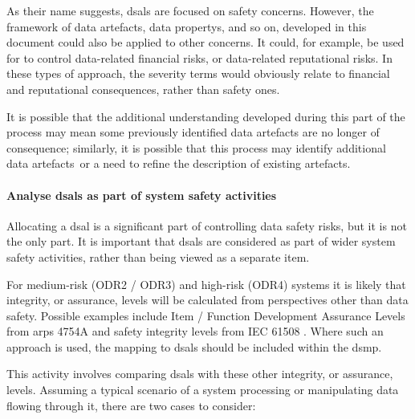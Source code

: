 As their name suggests, \glspl{dsal} are focused on safety concerns. However, the framework of \glspl{data artefact}, \glspl{data property}, and so on, developed in this document could also be applied to other concerns. It could, for example, be used for to control data-related financial risks, or data-related reputational risks. In these types of approach, the severity terms would obviously relate to financial and reputational consequences, rather than safety ones.

It is possible that the additional understanding developed during this part of the process may mean some previously identified \glspl{data artefact} are no longer of consequence; similarly, it is possible that this process may identify additional \cbstart\glspl{data artefact}\cbend\ or a need to refine the description of existing artefacts.

\paragraph{Analyse \glspl{dsal} as part of system safety activities}
\label{bkm:activities:analyse:partofsystemsafetyactivities}
Allocating a \gls{dsal} is a significant part of controlling data safety risks, but it is not the only part. It is important that \glspl{dsal} are considered as part of wider system safety activities, rather than being viewed as a separate item.

For medium-risk (ODR2 / ODR3) and high-risk (ODR4) systems it is likely that \gls{integrity}, or assurance, levels will be calculated from perspectives other than data safety. Possible examples include Item / Function Development Assurance Levels from \glspl{arp} 4754A \cite{citation:arp4754a2010guidelines} and safety \gls{integrity} levels from IEC 61508 \cite{citation:iec615083}.
Where such an approach is used, the mapping to \glspl{dsal} should be included within the \gls{dsmp}.

This activity involves comparing \glspl{dsal} with these other \gls{integrity}, or assurance, levels. Assuming a typical scenario of a system processing or manipulating data flowing through it, there are two cases to consider:

